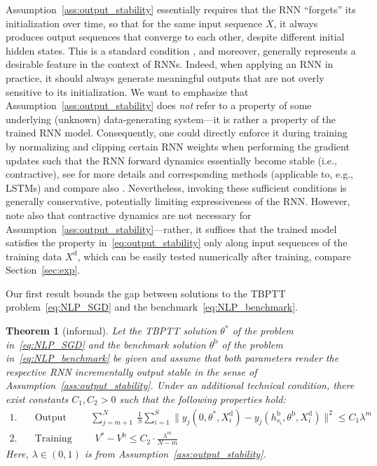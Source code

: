 \documentclass{article} %
\newtheorem{thm}{Theorem}
\begin{document}
Assumption~\ref{ass:output_stability} essentially requires that the RNN ``forgets'' its initialization over time, so that for the same input sequence $X$, it always produces output sequences that converge to each other, despite different initial hidden states.
This is a standard condition \citep{Ljung1978}, and moreover, {generally} represents a desirable feature in the context of RNNs.
Indeed, when applying an RNN in practice, it should always generate meaningful outputs that are not overly sensitive to its initialization.
We want to emphasize that Assumption~\ref{ass:output_stability} does \emph{not} refer to a property of some underlying (unknown) data-generating system---it is rather a property of the trained RNN model.
Consequently, one could directly enforce it during training by normalizing and clipping certain RNN weights when performing the gradient updates such that the RNN forward dynamics essentially become stable (i.e., contractive), see \citet{Miller2019} for more details and corresponding methods (applicable to, e.g., LSTMs) and compare also \citet{Bonassi2021,Kolter2019,Kozachkov2022}.
Nevertheless, invoking these sufficient conditions is generally conservative, potentially limiting expressiveness of the RNN. However, note also that contractive dynamics are not necessary for Assumption~\ref{ass:output_stability}---rather, it suffices that the trained model satisfies the property in~\eqref{eq:output_stability} only along input sequences of the training data $X^\mathrm{d}$, which can be easily tested numerically after training, compare Section~\ref{sec:exp}.

Our first result bounds the gap between solutions to the TBPTT problem~\eqref{eq:NLP_SGD} and the benchmark~\eqref{eq:NLP_benchmark}.

\begin{thm}[informal]\label{cor:TP_informal}
	Let the TBPTT solution $\theta^*$ of the problem in~\eqref{eq:NLP_SGD} and the benchmark solution $\theta^\mathrm{b}$ of the problem in~\eqref{eq:NLP_benchmark} be given and assume that both parameters render the respective RNN incrementally output stable in the sense of Assumption~\ref{ass:output_stability}.
	Under an additional technical condition, there exist constants $C_1,C_2>0$ such that the following properties hold:
	\begin{align*}
		\text{1.} & \quad \text{Output accuracy:}
		&& \sum_{j=m+1}^{N} \ \frac{1}{S}\sum_{i=1}^{S}\|y_j(0,\theta^*,X^\mathrm{d}_i)-y_j(h_{s_i}^\mathrm{b},\theta^\mathrm{b},X^\mathrm{d}_i)\|^2
		\leq C_1\lambda^m\\
		\text{2.} & \quad \text{Training regret:}
		&& \ \ V^* - V^\mathrm{b} \leq C_2 \cdot \frac{\lambda^m}{N-m}
	\end{align*}
	Here, $\lambda\in(0,1)$ is from Assumption~\ref{ass:output_stability}.
\end{thm}
\end{document}
